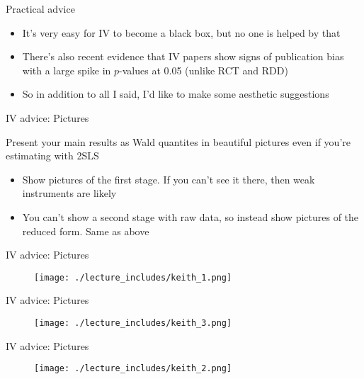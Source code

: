 \documentclass{beamer}
\begin{document}
\begin{frame}{Practical advice}

\begin{itemize}
\item It's very easy for IV to become a black box, but no one is helped by that
\item There's also recent evidence that IV papers show signs of publication bias with a large spike in $p$-values at 0.05 (unlike RCT and RDD)
\item So in addition to all I said, I'd like to make some aesthetic suggestions

\end{itemize}

\end{frame}



\begin{frame}{IV advice: Pictures}

Present your main results as Wald quantites in beautiful pictures even if you're estimating with 2SLS
	\begin{itemize}
	\item Show pictures of the first stage. If you can't see it there, then weak instruments are likely
	\item You can't show a second stage with raw data, so instead show pictures of the reduced form. Same as above
	\end{itemize}

\end{frame}



\begin{frame}{IV advice: Pictures}
	
	\begin{figure}
	\texttt{[image: ./lecture\_includes/keith\_1.png]}
	\end{figure}
	
\end{frame}


\begin{frame}{IV advice: Pictures}
	
	\begin{figure}
	\texttt{[image: ./lecture\_includes/keith\_3.png]}
	\end{figure}
	
\end{frame}

\begin{frame}{IV advice: Pictures}
	
	\begin{figure}
	\texttt{[image: ./lecture\_includes/keith\_2.png]}
	\end{figure}
	
\end{frame}
\end{document}
